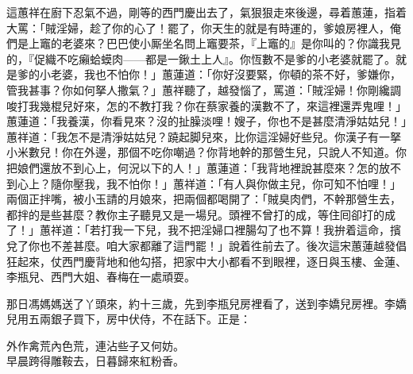 這蕙祥在廚下忍氣不過，剛等的西門慶出去了，氣狠狠走來後邊，尋着蕙蓮，指着大罵：「賊淫婦，趁了你的心了！罷了，你天生的就是有時運的，爹娘房裡人，俺們是上竈的老婆來？巴巴使小厮坐名問上竈要茶，『上竈的』是你叫的？你識我見的，『促織不吃癩蛤蟆肉——都是一鍬土上人』。你恆數不是爹的小老婆就罷了。就是爹的小老婆，我也不怕你！」蕙蓮道：「你好沒要緊，你頓的茶不好，爹嫌你，管我甚事？你如何拏人撒氣？」蕙祥聽了，越發惱了，罵道：「賊淫婦！你剛纔調唆打我幾棍兒好來，怎的不教打我？你在蔡家養的漢數不了，來這裡還弄鬼哩！」蕙蓮道：「我養漢，你看見來？沒的扯臊淡哩！嫂子，你也不是甚麼清淨姑姑兒！」{}蕙祥道：「我怎不是清淨姑姑兒？蹺起脚兒來，比你這淫婦好些兒。{}你漢子有一拏小米數兒！你在外邊，那個不吃你嘲過？你背地幹的那營生兒，只說人不知道。你把娘們還放不到心上，何況以下的人！」{}蕙蓮道：「我背地裡說甚麼來？怎的放不到心上？隨你壓我，我不怕你！」蕙祥道：「有人與你做主兒，你可知不怕哩！」兩個正拌嘴，被小玉請的月娘來，把兩個都喝開了：「賊臭肉們，不幹那營生去，都拌的是些甚麼？教你主子聽見又是一場兒。頭裡不曾打的成，等住囘卻打的成了！」蕙祥道：「若打我一下兒，我不把淫婦口裡腸勾了也不算！我拚着這命，擯兌了你也不差甚麼。咱大家都離了這門罷！」說着徃前去了。後次這宋蕙蓮越發倡狂起來，仗西門慶背地和他勾搭，把家中大小都看不到眼裡，逐日與玉樓、金蓮、李瓶兒、西門大姐、春梅在一處頑耍。

那日馮媽媽送了丫頭來，約十三歲，先到李瓶兒房裡看了，送到李嬌兒房裡。李嬌兒用五兩銀子買下，房中伏侍，不在話下。正是：

\begin{myquote} 
外作禽荒內色荒，連沾些子又何妨。\\早晨跨得雕鞍去，日暮歸來紅粉香。
\end{myquote} 

